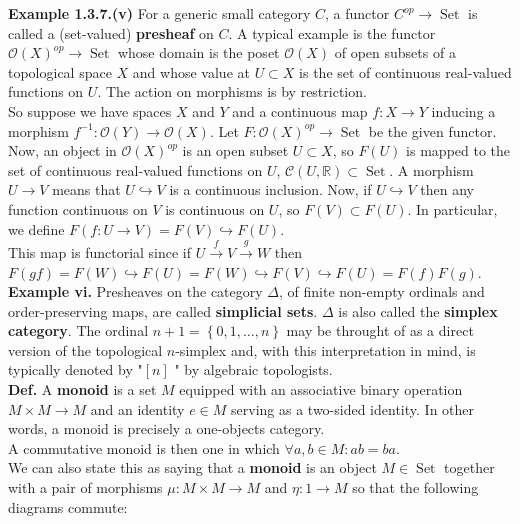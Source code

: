 \documentclass[a4paper]{article}
\theoremstyle{plain}%
\theoremstyle{definition}
\theoremstyle{remark}
\DeclareMathOperator{\Set}{Set}
\begin{document}
\textbf{Example 1.3.7.(v)} For a generic small category $C$, a functor
$C^{op} \to \Set$ is called a (set-valued) \textbf{presheaf} on
$C$. A typical example is the functor $\mathcal{O}(X)^{op}\to \Set$ whose
domain is the poset $\mathcal{O}(X)$ of open subsets of a topological space $X$
and whose value at $U \subset X$ is the set of continuous real-valued functions on
$U$. The action on morphisms is by restriction.\\
So suppose we have spaces $X$ and $Y$ and a continuous map $f  \colon X \to Y$
inducing a morphism $f^{-1}  \colon \mathcal{O}(Y) \to \mathcal{O}(X)$. Let
$F  \colon \mathcal{O}(X)^{op} \to \Set$ be the given functor. Now, an object
in $\mathcal{O}(X)^{op}$ is an open subset $U \subset X$, so $F(U)$ is mapped
to the set of continuous real-valued functions on $U$, $\mathcal{C}(U,\mathbb{R}) \subset
\Set$. A morphism  $U \to V$ means that $U \hookrightarrow V$ is a continuous
inclusion.  Now, if $U \hookrightarrow V$ then any function continuous on $V$
is continuous on $U$, so $F(V) \subset F(U)$. In particular, we define
$F(f  \colon U \to V) = F(V) \hookrightarrow F(U)$.\\
\linebreak
This map is functorial since if $U \stackrel{f}{\to } V \stackrel{g}{\to
} W $    then
$F(gf) = F(W) \hookrightarrow F(U) = F(W) \hookrightarrow F(V) \hookrightarrow
F(U) = F(f) F(g)$.\\
 \linebreak
 \textbf{Example vi.} Presheaves on the category $\Delta$, of finite non-empty
 ordinals and order-preserving maps, are called \textbf{simplicial sets}.
 $\Delta$ is also called the \textbf{simplex category}. The ordinal
 $n+1 = \left\{ 0, 1, \ldots, n \right\} $ may be throught of as a direct
 version of the topological $n$-simplex and, with this interpretation in mind,
 is typically denoted by "$\left[ n \right] $ " by algebraic topologists.\\
 \linebreak
 \textbf{Def.} A \textbf{monoid} is a set $M$ equipped with an associative
 binary operation $M \times M \to M$ and an identity $e \in M$ serving as
 a two-sided identity. In other words, a monoid is precisely a one-objects
 category.\\
 A commutative monoid is then one in which $\forall a,b \in M  \colon ab
 = ba$.\\
 \linebreak
We can also state this as saying that a \textbf{monoid} is an object $M \in
\Set$ together with a pair of morphisms $\mu  \colon M \times M \to M$ and
$\eta  \colon 1 \to M$ so that the following diagrams commute:
\end{document}
